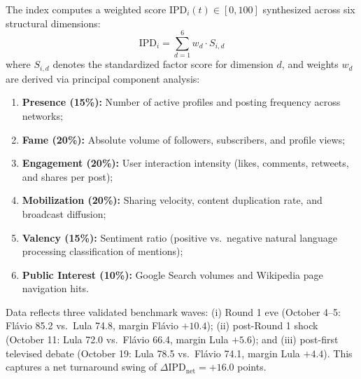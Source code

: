 The index computes a weighted score $\text{IPD}_i(t) \in [0, 100]$ synthesized across six structural dimensions:
\begin{equation}
\text{IPD}_i = \sum_{d=1}^6 w_d \cdot S_{i,d}
\end{equation}
where $S_{i,d}$ denotes the standardized factor score for dimension $d$, and weights $w_d$ are derived via principal component analysis:
\begin{enumerate}
    \item \textbf{Presence (15\%):} Number of active profiles and posting frequency across networks;
    \item \textbf{Fame (20\%):} Absolute volume of followers, subscribers, and profile views;
    \item \textbf{Engagement (20\%):} User interaction intensity (likes, comments, retweets, and shares per post);
    \item \textbf{Mobilization (20\%):} Sharing velocity, content duplication rate, and broadcast diffusion;
    \item \textbf{Valency (15\%):} Sentiment ratio (positive vs.\ negative natural language processing classification of mentions);
    \item \textbf{Public Interest (10\%):} Google Search volumes and Wikipedia page navigation hits.
\end{enumerate}
Data reflects three validated benchmark waves: (i) Round 1 eve (October 4--5: Fl{\'a}vio 85.2 vs.\ Lula 74.8, margin Fl{\'a}vio $+10.4$); (ii) post-Round 1 shock (October 11: Lula 72.0 vs.\ Fl{\'a}vio 66.4, margin Lula $+5.6$); and (iii) post-first televised debate (October 19: Lula 78.5 vs.\ Fl{\'a}vio 74.1, margin Lula $+4.4$). This captures a net turnaround swing of $\Delta \text{IPD}_{\text{net}} = +16.0$ points.

